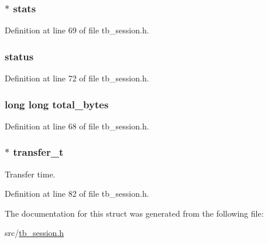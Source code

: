 \hypertarget{structtb__session__t_a464593aa6d4c80e0f689c501c4e81e8c}{
\subsubsection[{stats}]{$\ast$ stats}}\label{structtb__session__t_a464593aa6d4c80e0f689c501c4e81e8c}


Definition at line 69 of file tb\-\_\-session.\-h.

\hypertarget{structtb__session__t_a92613ed83a3cc0d2644758af475d9782}{
\subsubsection[{status}]{ status}}\label{structtb__session__t_a92613ed83a3cc0d2644758af475d9782}


Definition at line 72 of file tb\-\_\-session.\-h.

\hypertarget{structtb__session__t_af8b7f35061eb6fd4b3cda13b50755b89}{
\subsubsection[{total\-\_\-bytes}]{\setlength{\rightskip}{0pt plus 5cm}long long total\-\_\-bytes}}\label{structtb__session__t_af8b7f35061eb6fd4b3cda13b50755b89}


Definition at line 68 of file tb\-\_\-session.\-h.

\hypertarget{structtb__session__t_a0cb6fc264a37771e927fe0b383fc600c}{
\subsubsection[{transfer\-\_\-t}]{$\ast$ transfer\-\_\-t}}\label{structtb__session__t_a0cb6fc264a37771e927fe0b383fc600c}


Transfer time. 



Definition at line 82 of file tb\-\_\-session.\-h.



The documentation for this struct was generated from the following file\-:\begin{DoxyCompactItemize}
\item 
src/\hyperlink{tb__session_8h}{tb\-\_\-session.\-h}\end{DoxyCompactItemize}

